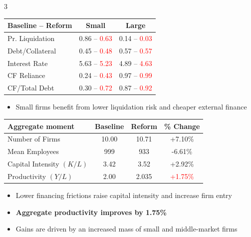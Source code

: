\documentclass[10pt]{article}
\begin{document}
\begin{multicols}{3}
\begin{tcolorbox}[title=Main Results: Cutting Reorganization Costs]
\vspace{1mm}

\small
\centering
\begin{tabular}{lcc}
\toprule
\textbf{Baseline -- Reform} & \textbf{Small} & \textbf{Large} \\
\midrule
Pr. Liquidation & 0.86 -- \textcolor{red}{0.63} & 0.14 -- \textcolor{red}{0.03} \\
Debt/Collateral & 0.45 -- \textcolor{red}{0.48} & 0.57 -- \textcolor{red}{0.57} \\
Interest Rate & 5.63 -- \textcolor{red}{5.23} & 4.89 -- \textcolor{red}{4.63} \\
CF Reliance & 0.24 -- \textcolor{red}{0.43} & 0.97 -- \textcolor{red}{0.99} \\
CF/Total Debt & 0.30 -- \textcolor{red}{0.72} & 0.87 -- \textcolor{red}{0.92} \\
\bottomrule
\end{tabular}

\vspace{2mm}

\begin{itemize}
    \item Small firms benefit from lower liquidation risk and cheaper external finance
\end{itemize}

\vspace{2mm}


\begin{tabular}{lccc}
\toprule
\textbf{Aggregate moment} & \textbf{Baseline} & \textbf{Reform} & \textbf{\% Change} \\
\midrule
Number of Firms & 10.00 & 10.71 & +7.10\% \\
Mean Employees & 999 & 933 & -6.61\% \\
Capital Intensity $(K/L)$ & 3.42 & 3.52 & +2.92\% \\
Productivity $(Y/L)$ & 2.00 & 2.035 & \textcolor{red}{+1.75\%} \\
\bottomrule
\end{tabular}

\normalsize
\vspace{1mm}

\begin{itemize}
    \item Lower financing frictions raise capital intensity and increase firm entry
    \item \textbf{Aggregate productivity improves by 1.75\%}
    \item Gains are driven by an increased mass of small and middle-market firms
\end{itemize}
\end{tcolorbox}


\end{multicols}
\end{document}
